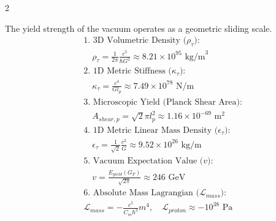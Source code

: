 \begin{multicols}{2}
\begin{tcolorbox}[cheatbox, title={\refstepcounter{cheatnum}\label{box:continuum_constants}\thecheatnum. Constants \& Scale Invariance \scriptsize\hfill\hyperref[sec:deriv_continuum_constants]{[Proof $\downarrow$]}}]
The yield strength of the vacuum operates as a geometric sliding scale. 
\begin{align}
    &\text{1. 3D Volumetric Density ($\rho_{\tau}$):} \nonumber \\
    &\quad \rho_{\tau} = \frac{1}{2\pi} \frac{c^5}{\hbar G^2} \approx 8.21 \times 10^{95} \text{ kg/m}^3 \label{eq:rho_tau_corrected} \\
    &\text{2. 1D Metric Stiffness ($\kappa_{\tau}$):} \nonumber \\
    &\quad \kappa_{\tau} = \frac{c^4}{G l_p} \approx 7.49 \times 10^{78} \text{ N/m} \label{eq:kappa_tau_corrected} \\
    &\text{3. Microscopic Yield (Planck Shear Area):} \nonumber \\
    &\quad A_{shear, p} = \sqrt{2}\pi l_p^2 \approx 1.16 \times 10^{-69} \text{ m}^2 \label{eq:planck_shear_area} \\
    &\text{4. 1D Metric Linear Mass Density ($\epsilon_{\tau}$):} \nonumber \\
    &\quad \epsilon_{\tau} = \frac{1}{\sqrt{2}} \frac{c^2}{G} \approx 9.52 \times 10^{26} \text{ kg/m} \label{eq:epsilon_tau_density} \\
    &\text{5. Vacuum Expectation Value ($v$):} \nonumber \\
    &\quad v = \frac{E_{yield}(G_F)}{\sqrt{2\pi}} \approx 246 \text{ GeV} \label{eq:vev_derivation} \\
    &\text{6. Absolute Mass Lagrangian ($\mathcal{L}_{mass}$):} \nonumber \\
    &\mathcal{L}_{mass} = - \frac{c^5}{C_m \hbar^3} m^4, \quad \mathcal{L}_{proton} \approx -10^{38} \text{ Pa} \label{eq:absolute_mass_lagrangian} 
\end{align}
\end{tcolorbox}


\end{multicols}
